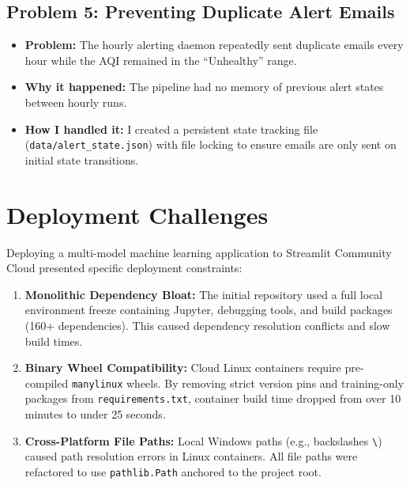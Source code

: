 \documentclass[12pt,a4paper]{article}
\begin{document}
\subsection{Problem 5: Preventing Duplicate Alert Emails}
\begin{itemize}
    \item \textbf{Problem:} The hourly alerting daemon repeatedly sent duplicate emails every hour while the AQI remained in the ``Unhealthy'' range.
    \item \textbf{Why it happened:} The pipeline had no memory of previous alert states between hourly runs.
    \item \textbf{How I handled it:} I created a persistent state tracking file (\texttt{data/alert\_state.json}) with file locking to ensure emails are only sent on initial state transitions.
\end{itemize}

\section{Deployment Challenges}

Deploying a multi-model machine learning application to Streamlit Community Cloud presented specific deployment constraints:

\begin{enumerate}
    \item \textbf{Monolithic Dependency Bloat:} The initial repository used a full local environment freeze containing Jupyter, debugging tools, and build packages (160+ dependencies). This caused dependency resolution conflicts and slow build times.
    \item \textbf{Binary Wheel Compatibility:} Cloud Linux containers require pre-compiled \texttt{manylinux} wheels. By removing strict version pins and training-only packages from \texttt{requirements.txt}, container build time dropped from over 10 minutes to under 25 seconds.
    \item \textbf{Cross-Platform File Paths:} Local Windows paths (e.g., backslashes \texttt{\textbackslash}) caused path resolution errors in Linux containers. All file paths were refactored to use \texttt{pathlib.Path} anchored to the project root.
\end{enumerate}

\end{document}
